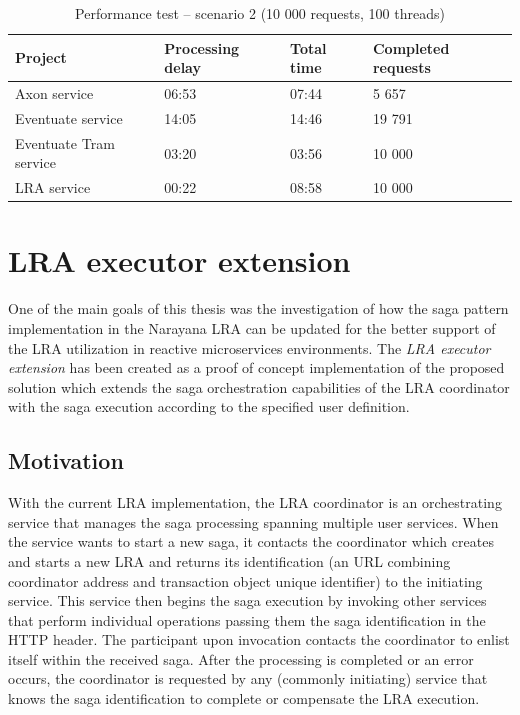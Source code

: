 \documentclass[oneside,
  digital, %
  table,   %
  lof,     %
  lot,     %
]{fithesis3}
\begin{document}
\begin{table}[h]
    \begin{tabularx}{\textwidth}{lXXX}
        \toprule
        Project & Processing delay & Total time & Completed requests \\
        \midrule
        Axon service & 06:53 & 07:44 & 5 657 \\
        Eventuate service & 14:05 & 14:46 & 19 791 \\
        Eventuate Tram service & 03:20 & 03:56 & 10 000 \\
        LRA service & 00:22 & 08:58 & 10 000 \\
        \bottomrule
    \end{tabularx}
    \caption{Performance test -- scenario 2 (10 000 requests, 100 threads)}
    \label{tab:performance-scenario-2}
\end{table}

\clearpage
\chapter{LRA executor extension}

One of the main goals of this thesis was the investigation of how the saga pattern implementation in the Narayana LRA can be updated for the better support of the LRA utilization in reactive microservices environments. The \textit{LRA executor extension} has been created as a proof of concept implementation of the proposed solution which extends the saga orchestration capabilities of the LRA coordinator with the saga execution according to the specified user definition.

\section{Motivation}

With the current LRA implementation, the LRA coordinator is an orchestrating service that manages the saga processing spanning multiple user services. When the service wants to start a new saga, it contacts the coordinator which creates and starts a new LRA and returns its identification (an URL combining coordinator address and transaction object unique identifier) to the initiating service. This service then begins the saga execution by invoking other services that perform individual operations passing them the saga identification in the HTTP header. The participant upon invocation contacts the coordinator to enlist itself within the received saga. After the processing is completed or an error occurs, the coordinator is requested by any (commonly initiating) service that knows the saga identification to complete or compensate the LRA execution.
\end{document}
